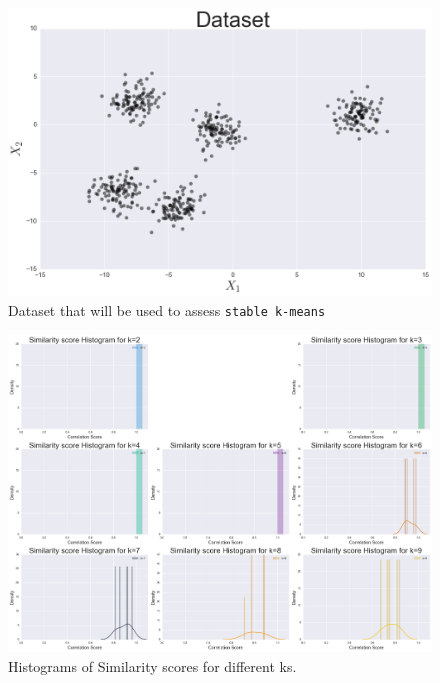 \documentclass[10pt,twocolumn,letterpaper]{article}
\begin{document}
\begin{figure}[htbp] 
\begin{center}
\includegraphics[scale=0.25]{figure/dataset.png}
\end{center}

\caption{\label{fig:Dataset-that-will}Dataset that will be used to assess
\texttt{stable k-means}}

\end{figure}


\begin{figure}[htbp] 
\begin{center}
\includegraphics[scale=0.35]{figure/histogram.png}
\end{center}

\caption{\label{fig:Histograms-of-Similarity}Histograms of Similarity scores
for different ks.}


\end{figure}
\end{document}
